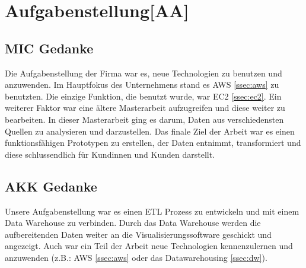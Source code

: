 \chapter{Aufgabenstellung[AA]}
\section{MIC Gedanke}
Die Aufgabenstellung der Firma war es, neue Technologien zu benutzen und anzuwenden. Im Hauptfokus des Unternehmens stand es AWS \ref{ssec:aws} zu benutzten. Die einzige Funktion, die benutzt wurde, war EC2 \ref{ssec:ec2}. Ein weiterer Faktor war eine ältere Masterarbeit aufzugreifen und diese weiter zu bearbeiten. In dieser Masterarbeit ging es darum, Daten aus verschiedensten Quellen zu analysieren und darzustellen. Das finale Ziel der Arbeit war es einen funktionsfähigen Prototypen zu erstellen, der Daten entnimmt, transformiert und diese schlussendlich für Kundinnen und Kunden darstellt.
\section{AKK Gedanke}
Unsere Aufgabenstellung war es einen ETL Prozess zu entwickeln und mit einem Data Warehouse zu verbinden. Durch das Data Warehouse werden die aufbereitenden Daten weiter an die Visualisierungssoftware geschickt und angezeigt. Auch war ein Teil der Arbeit neue Technologien kennenzulernen und anzuwenden (z.B.: AWS \ref{ssec:aws} oder das Datawarehousing \ref{ssec:dw}).